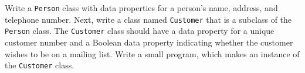\label{inheritance:customer}
Write a \texttt{Person} class with data properties for a person's name, address, and telephone number. Next, write a class named \texttt{Customer} that is a subclass of the \texttt{Person} class. The \texttt{Customer} class should have a data property for a unique customer number and a Boolean data property indicating whether the customer wishes to be on a mailing list. Write a small program, which makes an instance of the \texttt{Customer} class.
